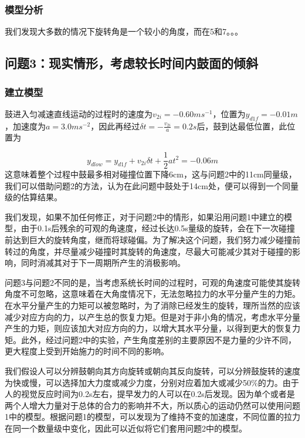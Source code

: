 \documentclass[nocover]{cumcmart}%
\begin{document}
\subsubsection{模型分析}
我们发现大多数的情况下旋转角是一个较小的角度，而在5和7。。。

\subsection{问题3：现实情形，考虑较长时间内鼓面的倾斜}
\subsubsection{建立模型}

鼓进入匀减速直线运动的过程时的速度为$v_{2i} = -0.60 ms^{-1}$，位置为$y_{d1f} = -0.01m$，加速度为$a = 3.0ms^{-2}$，因此再经过$\delta t = -\frac{v_{2i}}{a} = 0.2s$后，鼓到达最低位置，此位置为

$$y_{dlow} = y_{d1f} + v_{2i}\delta t + \frac{1}{2}at^2 = -0.06m$$
这意味着整个过程中鼓最多相对碰撞位置下降6cm，这与问题2中的11cm同量级，我们可以借助问题2的方法，认为在此问题中鼓处于14cm处，便可以得到一个同量级的估算结果。

我们发现，如果不加任何修正，对于问题2中的情形，如果沿用问题1中建立的模型，由于0.1s后残余的可观的角速度，经过长达0.5s量级的旋转，会在下一次碰撞前达到巨大的旋转角度，继而将球碰偏。为了解决这个问题，我们努力减少碰撞前转过的角度，并尽量减少碰撞时其旋转的角速度，尽最大可能减少其对于碰撞的影响，同时消减其对于下一周期所产生的消极影响。

问题3与问题2不同的是，当考虑系统长时间的过程时，可观的角速度可能使其旋转角度不可忽略，这意味着在大角度情况下，无法忽略拉力的水平分量产生的力矩。在水平分量产生的力矩可以被忽略时，为了消除已经发生的旋转，理所当然的应该减少对应方向的力，以产生总的恢复力矩。但是对于非小角的情况，考虑水平分量产生的力矩，则应该加大对应方向的力，以增大其水平分量，以得到更大的恢复力矩。此外，经过问题2中的实验，产生角度差别的主要原因不是力量的少许不同，更大程度上受到开始施力的时间不同的影响。


我们假设人可以分辨鼓朝向其方向旋转或朝向其反向旋转，可以分辨鼓旋转的速度为快或慢，可以选择加大力度或减少力度，分别对应着加大或减少50\%的力。由于人的视觉反应时间为0.2s左右，提早发力的人可以在0.2s后发现。因为单个或者是两个人增大力量对于总体的合力的影响并不大，所以质心的运动仍然可以使用问题1中的模型。根据问题1的模型，可以发现为了维持不变的加速度，不同位置的拉力在同一个数量级中变化，因此可以近似将它们套用问题2中的模型。
\end{document}
